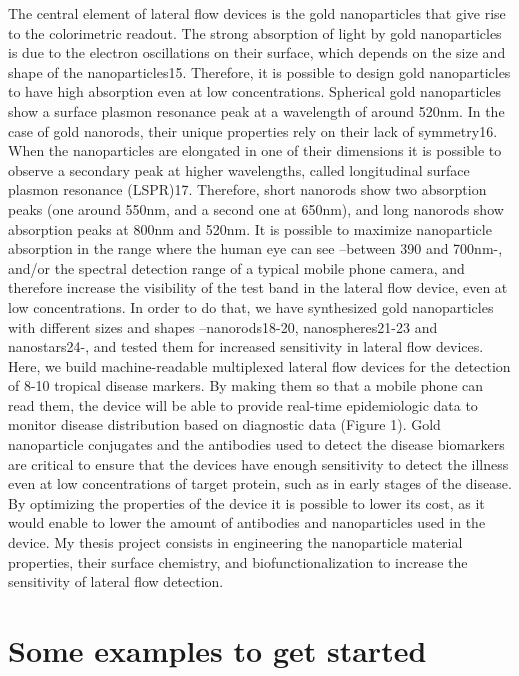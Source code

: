 \documentclass{article}
\begin{document}
The central element of lateral flow devices is the gold nanoparticles that give rise to the colorimetric readout. The strong absorption of light by gold nanoparticles is due to the electron oscillations on their surface, which depends on the size and shape of the nanoparticles15. Therefore, it is possible to design gold nanoparticles to have high absorption even at low concentrations. Spherical gold nanoparticles show a surface plasmon resonance peak at a wavelength of around 520nm. In the case of gold nanorods, their unique properties rely on their lack of symmetry16. When the nanoparticles are elongated in one of their dimensions it is possible to observe a secondary peak at higher wavelengths, called longitudinal surface plasmon resonance (LSPR)17. Therefore, short nanorods show two absorption peaks (one around 550nm, and a second one at 650nm), and long nanorods show absorption peaks at 800nm and 520nm. It is possible to maximize nanoparticle absorption in the range where the human eye can see –between 390 and 700nm-, and/or the spectral detection range of a typical mobile phone camera, and therefore increase the visibility of the test band in the lateral flow device, even at low concentrations. In order to do that, we have synthesized gold nanoparticles with different sizes and shapes –nanorods18-20, nanospheres21-23 and nanostars24-, and tested them for increased sensitivity in lateral flow devices. \\
Here, we build machine-readable multiplexed lateral flow devices for the detection of 8-10 tropical disease markers. By making them so that a mobile phone can read them, the device will be able to provide real-time epidemiologic data to monitor disease distribution based on diagnostic data (Figure 1). Gold nanoparticle conjugates and the antibodies used to detect the disease biomarkers are critical to ensure that the devices have enough sensitivity to detect the illness even at low concentrations of target protein, such as in early stages of the disease. By optimizing the properties of the device it is possible to lower its cost, as it would enable to lower the amount of antibodies and nanoparticles used in the device. My thesis project consists in engineering the nanoparticle material properties, their surface chemistry, and biofunctionalization to increase the sensitivity of lateral flow detection. \\

\newpage
\chapter{Some examples to get started}
\end{document}
